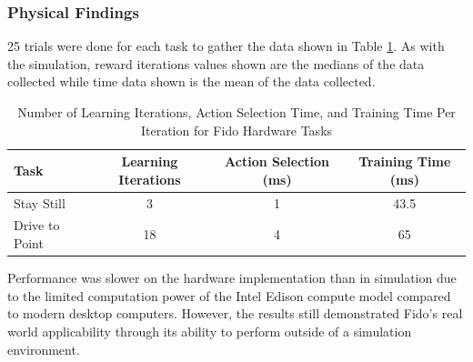 \subsubsection{Physical Findings}

25 trials were done for each task to gather the data shown in Table \ref{tab:data2}.
As with the simulation, reward iterations values shown are the medians of the data collected while time data shown is the mean of the data collected.

\begin{table}[ht]
	\centering
	\begin{tabular}{@{}lccc@{}}
		\toprule
		Task             & Learning Iterations & Action Selection (ms) & Training Time (ms) \\ \midrule
		Stay Still       & 3                   & 1                    & 43.5                  \\
		Drive to Point   & 18                  & 4                     & 65                  \\
	\end{tabular}
	\caption{Number of Learning Iterations, Action Selection Time, and Training Time Per Iteration for Fido Hardware Tasks}
	\label{tab:data2}
\end{table}

Performance was slower on the hardware implementation than in simulation due to the limited computation power of the Intel Edison compute model compared to modern desktop computers.
However, the results still demonstrated Fido's real world applicability through its ability to perform outside of a simulation environment.
